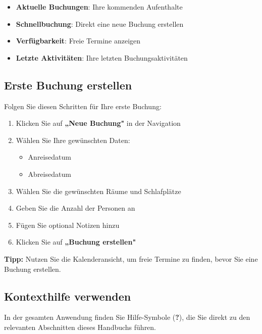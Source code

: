 \begin{itemize}
    \item \textbf{Aktuelle Buchungen}: Ihre kommenden Aufenthalte
    \item \textbf{Schnellbuchung}: Direkt eine neue Buchung erstellen
    \item \textbf{Verfügbarkeit}: Freie Termine anzeigen
    \item \textbf{Letzte Aktivitäten}: Ihre letzten Buchungsaktivitäten
\end{itemize}

\subsection{Erste Buchung erstellen}

Folgen Sie diesen Schritten für Ihre erste Buchung:

\begin{enumerate}
    \item Klicken Sie auf \textbf{„Neue Buchung"} in der Navigation
    \item Wählen Sie Ihre gewünschten Daten:
        \begin{itemize}
            \item Anreisedatum
            \item Abreisedatum
        \end{itemize}
    \item Wählen Sie die gewünschten Räume und Schlafplätze
    \item Geben Sie die Anzahl der Personen an
    \item Fügen Sie optional Notizen hinzu
    \item Klicken Sie auf \textbf{„Buchung erstellen"}
\end{enumerate}

\textbf{Tipp:} Nutzen Sie die Kalenderansicht, um freie Termine zu finden, bevor Sie eine Buchung erstellen.

\subsection{Kontexthilfe verwenden}

In der gesamten Anwendung finden Sie Hilfe-Symbole (\textbf{?}), die Sie direkt zu den relevanten Abschnitten dieses Handbuchs führen.

\newpage